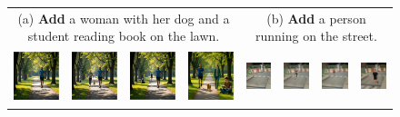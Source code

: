 \documentclass{article}
\begin{document}
\begin{figure}[h!]
\centering
\begin{tabular}{@{\hskip 1pt} p{\dimexpr\textwidth/9\relax}
                   @{\hskip 1pt} p{\dimexpr\textwidth/9\relax}
                   @{\hskip 1pt} p{\dimexpr\textwidth/9\relax}
                   @{\hskip 1pt} p{\dimexpr\textwidth/9\relax}
                   @{\hskip 5pt} p{\dimexpr\textwidth/9\relax}
                   @{\hskip 1pt} p{\dimexpr\textwidth/9\relax}
                   @{\hskip 1pt} p{\dimexpr\textwidth/9\relax}
                   @{\hskip 1pt} p{\dimexpr\textwidth/9\relax} @{}}

\multicolumn{4}{c}{\tiny (a) \textbf{Add} a woman with her dog and a student reading book on the lawn.} & 
\multicolumn{4}{c}{\tiny (b) \textbf{Add} a person running on the street.}  \\
\includegraphics[width=\linewidth,  height=1.5cm]{figures/f1/1_1.png} &
\includegraphics[width=\linewidth,  height=1.5cm]{figures/f1/1_2.png} &
\includegraphics[width=\linewidth,  height=1.5cm]{figures/f1/1_3.png} &
\includegraphics[width=\linewidth,  height=1.5cm]{figures/f1/1_4.png} &
\includegraphics[width=\linewidth,  height=1.5cm]{figures/f1/4_1.png} &
\includegraphics[width=\linewidth,  height=1.5cm]{figures/f1/4_2.jpg} &
\includegraphics[width=\linewidth,  height=1.5cm]{figures/f1/4_3.jpg} &
\includegraphics[width=\linewidth,  height=1.5cm]{figures/f1/4_4.png} \\[-1pt]


\end{tabular}
\end{figure}
\end{document}
